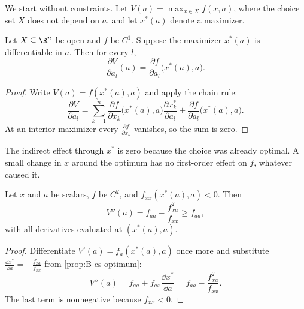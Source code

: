 We start without constraints. Let $V(a) = \max_{x \in X}f(x, a)$, where the choice set $X$ does not depend on $a$, and
let $x^*(a)$ denote a maximizer.

\begin{theorem}\label{thm:B-envelope}
Let $X \subseteq \R^n$ be open and $f$ be $C^1$. Suppose the maximizer $x^*(a)$ is differentiable in $a$. Then for every
$l$,
\begin{equation}\label{eq:B-envelope}
\frac{\partial V}{\partial a_l}(a) = \frac{\partial f}{\partial a_l}\big(x^*(a), a\big) .
\end{equation}
\end{theorem}

\begin{proof}
Write $V(a) = f(x^*(a), a)$ and apply the chain rule:
\begin{equation*}
\frac{\partial V}{\partial a_l} = \sum_{k = 1}^{n}\frac{\partial f}{\partial x_k}\big(x^*(a), a\big)\frac{\partial x_k^*}{\partial a_l}
+ \frac{\partial f}{\partial a_l}\big(x^*(a), a\big) .
\end{equation*}
At an interior maximizer every $\frac{\partial f}{\partial x_k}$ vanishes, so the sum is zero.
\end{proof}

The indirect effect through $x^*$ is zero because the choice was already optimal. A small change in $x$ around the
optimum has no first-order effect on $f$, whatever caused it.

\begin{corollary}\label{cor:B-envelope-second}
Let $x$ and $a$ be scalars, $f$ be $C^2$, and $f_{xx}(x^*(a), a) < 0$. Then
\begin{equation*}
V''(a) = f_{aa} - \frac{f_{xa}^2}{f_{xx}} \geq f_{aa} ,
\end{equation*}
with all derivatives evaluated at $(x^*(a), a)$.
\end{corollary}

\begin{proof}
Differentiate $V'(a) = f_a(x^*(a), a)$ once more and substitute $\frac{\dd x^*}{\dd a} = -\frac{f_{xa}}{f_{xx}}$ from
\cref{prop:B-cs-optimum}:
\begin{equation*}
V''(a) = f_{aa} + f_{ax}\frac{\dd x^*}{\dd a} = f_{aa} - \frac{f_{xa}^2}{f_{xx}} .
\end{equation*}
The last term is nonnegative because $f_{xx} < 0$.
\end{proof}


